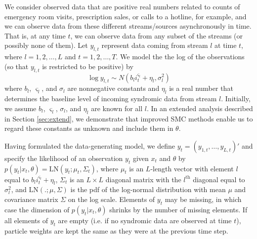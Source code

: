 \documentclass{elsarticle}
\begin{document}
%


We consider observed data that are positive real numbers related to counts of emergency room visits, prescription sales, or calls to a hotline, for example, and we can observe data from these different streams/sources asynchronously in time. That is, at any time $t$, we can observe data from any subset of the streams (or possibly none of them). Let $y_{l,t}$ represent data coming from stream $l$ at time $t$, where $l = 1,2,\ldots,L$ and $t = 1,2,\ldots,T$. We model the the log of the observations (so that $y_{l,t}$ is restricted to be positive) by
\begin{equation}
\log y_{l,t} \sim N\left(b_li_t^{\varsigma_l} + \eta_l,\sigma_l^2\right) \label{eqn:obs}
\end{equation}
where $b_l$, $\varsigma_l$, and $\sigma_l$ are nonnegative constants \citep{skvortsov2012monitoring} and $\eta_l$ is a real number that determines the baseline level of incoming syndromic data from stream $l$. Initially, we assume $b_l$, $\varsigma_l$, $\sigma_l$, and $\eta_l$ are known for all $l$. In an extended analysis described in Section \ref{sec:extend}, we demonstrate that improved SMC methods enable us to regard these constants as unknown and include them in $\theta$.

Having formulated the data-generating model, we define $y_t = (y_{1,t},\ldots,y_{L,t})'$ and specify the likelihood of an observation $y_t$ given $x_t$ and $\theta$ by $p(y_t|x_t,\theta) = \mbox{LN}(y_t;\mu_t,\Sigma_t)$, where $\mu_t$ is an $L$-length vector with element $l$ equal to $b_li_t^{\varsigma_l} + \eta_l$, $\Sigma_t$ is an $L \times L$ diagonal matrix with the $l^{\mbox{th}}$ diagonal equal to $\sigma_l^2$, and $\mbox{LN}(.;\mu,\Sigma)$ is the pdf of the log-normal distribution with mean $\mu$ and covariance matrix $\Sigma$ on the log scale. Elements of $y_t$ may be missing, in which case the dimension of $p(y_t|x_t,\theta)$ shrinks by the number of missing elements. %
If all elements of $y_t$ are empty (i.e. if no syndromic data are observed at time $t$), particle weights are kept the same as they were at the previous time step.
\end{document}
